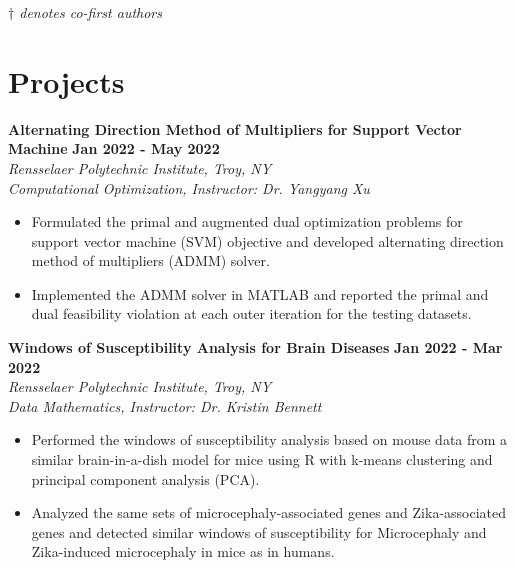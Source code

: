 \documentclass[letterpaper, 11pt]{article}
\newcommand{\subsectionvspace}{\vspace{6pt}}
\begin{document}
    \subsectionvspace

    \textit{$\dag$ denotes co-first authors}


\section{Projects}


    \textbf{Alternating Direction Method of Multipliers for Support Vector Machine} \hfill 
    \textbf{Jan 2022 - May 2022} \\
    \textit{Rensselaer Polytechnic Institute, Troy, NY} \\
    \textit{Computational Optimization, Instructor: Dr. Yangyang Xu}
    \begin{itemize}
        \item Formulated the primal and augmented dual optimization problems for support vector machine (SVM) objective and developed alternating direction method of multipliers (ADMM) solver.
        \item Implemented the ADMM solver in MATLAB and reported the primal and dual feasibility violation at each outer iteration for the testing datasets.
    \end{itemize}

    \subsectionvspace

    \textbf{Windows of Susceptibility Analysis for Brain Diseases} \hfill 
    \textbf{Jan 2022 - Mar 2022} \\
    \textit{Rensselaer Polytechnic Institute, Troy, NY} \\
    \textit{Data Mathematics, Instructor: Dr. Kristin Bennett}
    \begin{itemize}
        \item Performed the windows of susceptibility analysis based on mouse data from a similar brain-in-a-dish model for mice using R with k-means clustering and principal component analysis (PCA).
        \item Analyzed the same sets of microcephaly-associated genes and Zika-associated genes and detected similar windows of susceptibility for Microcephaly and Zika-induced microcephaly in mice as in humans.
    \end{itemize}

    \subsectionvspace
\end{document}
